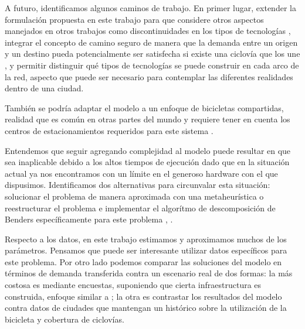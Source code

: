 A futuro, identificamos algunos caminos de trabajo. En primer lugar, extender la formulación propuesta en este trabajo para que considere otros aspectos manejados en otros trabajos como discontinuidades en los tipos de tecnologías \parencite{baya2021}, integrar el concepto de camino seguro de manera que la demanda entre un origen y un destino pueda potencialmente ser satisfecha si existe una ciclovía que los une \parencite{Duthie2014}, y permitir distinguir qué tipos de tecnologías se puede construir en cada arco de la red, aspecto que puede ser necesario para contemplar las diferentes realidades dentro de una ciudad.

También se podría adaptar el modelo a un enfoque de bicicletas compartidas, realidad que es común en otras partes del mundo y requiere tener en cuenta los centros de estacionamientos requeridos para este sistema \parencite{vogel2016}.

Entendemos que seguir agregando complejidad al modelo puede resultar en que sea inaplicable debido a los altos tiempos de ejecución dado que en la situación actual ya nos encontramos con un límite en el generoso hardware con el que dispusimos. Identificamos dos alternativas para circunvalar esta situación: solucionar el problema de manera aproximada con una metaheurística o reestructurar el problema e implementar el algorítmo de descomposición de Benders específicamente para este problema \parencite{bucarey2022}, \parencite{crainic2021}.

Respecto a los datos, en este trabajo estimamos y aproximamos muchos de los parámetros. Pensamos que puede ser interesante utilizar datos específicos para este problema. Por otro lado podemos comparar las soluciones del modelo en términos de demanda transferida contra un escenario real de dos formas: la más costosa es mediante encuestas, suponiendo que cierta infraestructura es construida, enfoque similar a \textcite{shwe2014}; la otra es contrastar los resultados del modelo contra datos de ciudades que mantengan un histórico sobre la utilización de la bicicleta y cobertura de ciclovías.
